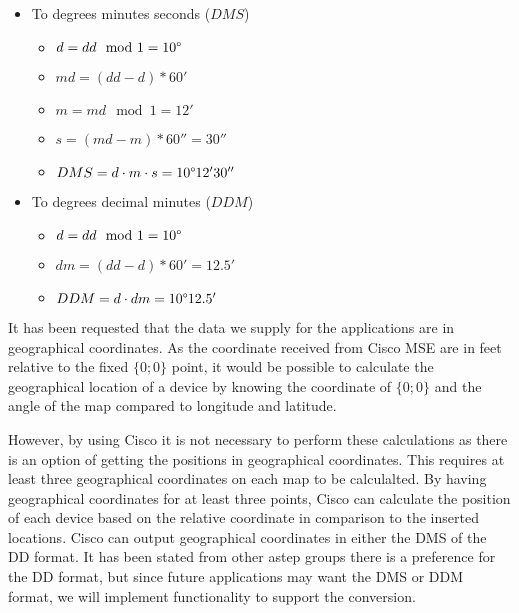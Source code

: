 \begin{itemize}
\begin{itemize}
		\item To degrees minutes seconds ($DMS$)
		\begin{itemize}
			\setlength\itemsep{0.00005em}
			\item $ d = dd \mod 1 = 10\degree $
			\item $ md = (dd - d) * 60' $
			\item $ m = md \mod 1 = 12' $
			\item $ s = (md - m) * 60'' = 30''$
			\item $ DMS = d \cdot m \cdot s = 10\degree 12' 30''$ 
		\end{itemize}
		\item To degrees decimal minutes ($DDM$)
		\begin{itemize}
			\setlength\itemsep{0.00005em}
			\item $ d = dd \mod 1 = 10\degree $
			\item $ dm = (dd - d) * 60' = 12.5' $
			\item $ DDM = d \cdot dm = 10\degree 12.5'$
		\end{itemize}
	\end{itemize}
\end{itemize}

It has been requested that the data we supply for the applications are in geographical coordinates.
As the coordinate received from Cisco MSE are in feet relative to the fixed $\{0;0\}$ point, it would be possible to calculate the geographical location of a device by knowing the coordinate of $\{0;0\}$ and the angle of the map compared to longitude and latitude. 

However, by using Cisco it is not necessary to perform these calculations as there is an option of getting the positions in geographical coordinates. This requires at least three geographical coordinates on each map to be calculalted. By having geographical coordinates for at least three points, Cisco can calculate the position of each device based on the relative coordinate in comparison to the inserted locations\cite{geo_cisco}. 
Cisco can output geographical coordinates in either the DMS of the DD format\cite{cisco_geo_type}. It has been stated from other astep groups there is a preference for the DD format, but since future applications may want the DMS or DDM format, we will implement functionality to support the conversion. 

